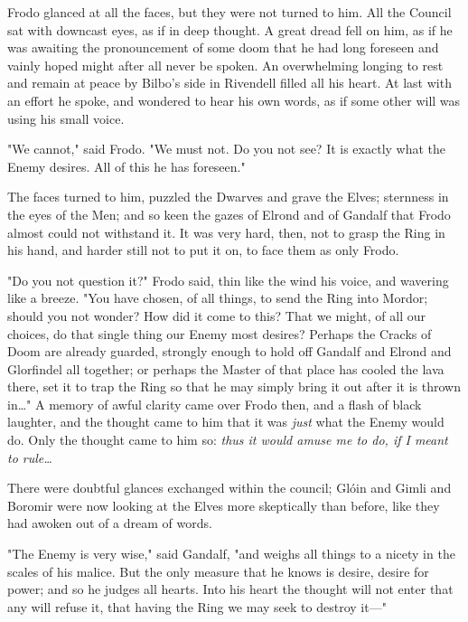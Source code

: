 

\noindent{}Frodo glanced at all the faces, but they were not turned to him. All the 
Council sat with downcast eyes, as if in deep thought. A great dread fell on 
him, as if he was awaiting the pronouncement of some doom that he had long 
foreseen and vainly hoped might after all never be spoken. An overwhelming 
longing to rest and remain at peace by Bilbo's side in Rivendell filled all his 
heart. At last with an effort he spoke, and wondered to hear his own words, as 
if some other will was using his small voice.

"We cannot," said Frodo. "We must not. Do you not see? It is exactly what the 
Enemy desires. All of this he has foreseen."

The faces turned to him, puzzled the Dwarves and grave the Elves; sternness in 
the eyes of the Men; and so keen the gazes of Elrond and of Gandalf that Frodo 
almost could not withstand it. It was very hard, then, not to grasp the Ring in 
his hand, and harder still not to put it on, to face them as only Frodo.

"Do you not question it?" Frodo said, thin like the wind his voice, and 
wavering like a breeze. "You have chosen, of all things, to send the Ring into 
Mordor; should you not wonder? How did it come to this? That we might, of all 
our choices, do that single thing our Enemy most desires? Perhaps the Cracks of 
Doom are already guarded, strongly enough to hold off Gandalf and Elrond and 
Glorfindel all together; or perhaps the Master of that place has cooled the 
lava there, set it to trap the Ring so that he may simply bring it out after it 
is thrown in{\ldots}" A memory of awful clarity came over Frodo then, and a 
flash of black laughter, and the thought came to him that it was \emph{just} 
what the Enemy would do. Only the thought came to him so: \emph{thus it would 
amuse me to do, if I meant to rule{\ldots}}

There were doubtful glances exchanged within the council; Glóin and Gimli and 
Boromir were now looking at the Elves more skeptically than before, like they 
had awoken out of a dream of words.

"The Enemy is very wise," said Gandalf, "and weighs all things to a nicety in 
the scales of his malice. But the only measure that he knows is desire, desire 
for power; and so he judges all hearts. Into his heart the thought will not 
enter that any will refuse it, that having the Ring we may seek to destroy 
it---"

